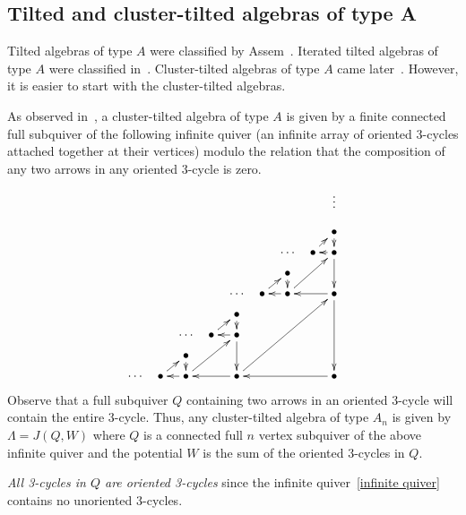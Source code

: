 \documentclass[ALCO,ThmDefs,Unicode,epreuves]{cedram}
\begin{document}
\subsection{Tilted and cluster-tilted algebras of type A}\label{ss34:tilted An}

Tilted algebras of type $A$ were classified by Assem~\cite{Asse}. Iterated tilted algebras of type $A$ were classified in~\cite{AH}. Cluster-tilted algebras of type $A$ came later~\cite{CCS, BV}. However, it is easier to start with the cluster-tilted algebras.

As observed in~\cite[2.5]{Asse2}, a cluster-tilted algebra of type $A$ is given by a finite connected full subquiver of the following infinite quiver (an infinite array of oriented 3-cycles attached together at their vertices) modulo the relation that the composition of any two arrows in any oriented 3-cycle is zero.
\begin{equation}\label{infinite quiver}
\xymatrixrowsep{6pt}\xymatrixcolsep{6pt}
\xymatrix{
&&&&&&&&\vdots\\
&&&&&&&&\bullet\ar[d]\\%
&&&&&& \cdots &\bullet\ar[ur]&\bullet\ar[l]\ar[dd]\\
&&&&&& \bullet\ar[d] \\
&&&& \cdots&\bullet\ar[ur] &\bullet\ar[l]\ar[uurr]&&\bullet\ar[ll]\ar[dddd]\\ %
&&&&\bullet\ar[d]\\%
&& \cdots &\bullet\ar[ur]&\bullet\ar[l]\ar[dd]\\
& & \bullet\ar[d] \\
\cdots &\bullet\ar[ur] &\bullet\ar[l]\ar[uurr]&&\bullet\ar[ll]\ar[uuuurrrr]&&&&\bullet\ar[llll] \\ %
	}%
\end{equation}
Observe that a full subquiver $Q$ containing two arrows in an oriented 3-cycle will contain the entire 3-cycle. Thus, any cluster-tilted algebra of type $A_n$ is given by $\Lambda=J(Q,W)$ where $Q$ is a connected full $n$ vertex subquiver of the above infinite quiver and the potential $W$ is the sum of the oriented 3-cycles in $Q$. 

\begin{rema} \emph{All 3-cycles in $Q$ are oriented 3-cycles} since the infinite quiver~\eqref{infinite quiver} contains no unoriented 3-cycles.
\end{rema}
\end{document}
